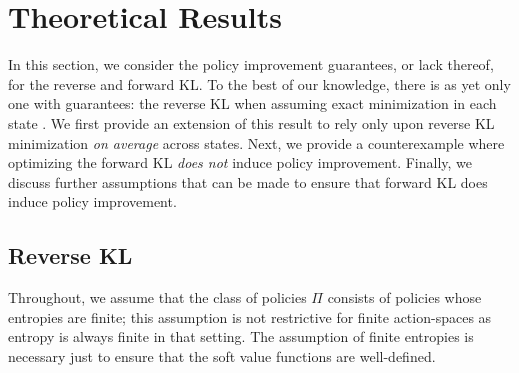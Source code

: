 \documentclass[twoside,11pt]{article}
\begin{document}
\section{Theoretical Results}

In this section, we consider the policy improvement guarantees, or lack thereof, for the reverse and forward KL. To the best of our knowledge, there is as yet only one with guarantees: the reverse KL when assuming exact minimization in each state \citep[Lemma 2]{haarnoja2018soft}. We first provide an extension of this result to rely only upon reverse KL minimization \textit{on average} across states. Next, we provide a counterexample where optimizing the forward KL \textit{does not} induce policy improvement.  Finally, we discuss further assumptions that can be made to ensure that forward KL does induce policy improvement.

\subsection{Reverse KL}
Throughout, we assume that the class of policies $\Pi$ consists of policies whose entropies are finite; this assumption is not restrictive for finite action-spaces as entropy is always finite in that setting. The assumption of finite entropies is necessary just to ensure that the soft value functions are well-defined. 
\end{document}
